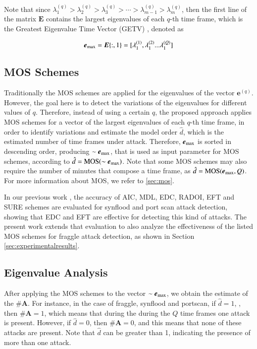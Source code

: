 \documentclass[review]{elsarticle}
\begin{document}
Note that since $\lambda_1^{(q)} > \lambda_2^{(q)} > \lambda_3^{(q)} > \cdots > \lambda_{m-1}^{(q)} > \lambda_m^{(q)}$, then the first line of the matrix $\boldsymbol{E}$ contains the largest eigenvalues of each $q$-th time frame, which is the Greatest Eigenvalue Time
Vector (GETV) \cite{tenorio2013greatest}, denoted as 

\begin{equation}\label{eq:eq08}
\boldsymbol{e}_{\rm max} = \boldsymbol{E}\{:,1\} = [ \lambda_1^{(1)}, \lambda_1^{(2)} ... \lambda_1^{(Q)}]
\end{equation}

\subsection{MOS Schemes}
\label{sec:prop_MOSSchemes}

Traditionally the MOS schemes are applied for the eigenvalues of the vector $\boldsymbol{e}^{(q)}$. However, the goal here is to detect the variations of the eigenvalues for different values of $q$. Therefore, instead of using a certain $q$, the proposed approach applies MOS schemes for a vector of the largest eigenvalues of each $q$-th time frame, in order to identify variations and estimate the model order $\hat{d}$, which is the estimated number of time frames under attack. Therefore, $\boldsymbol{e}_{\rm max}$ is sorted in descending order, producing $\sim\boldsymbol{e}_{\rm max}$, that is used as input parameter for MOS schemes, according to $\hat{d} = \rm{MOS}(\sim\boldsymbol{e}_{\rm max})$. Note that some MOS schemes may also require the number of minutes that compose a time frame, as $\hat{d} = \rm{MOS}(\boldsymbol{e}_{\rm max},\emph{Q})$. For more information about MOS, we refer to \ref{sec:mos}.

In our previous work \cite{tenorio2013greatest}, the accuracy of AIC, MDL, EDC, RADOI, EFT and SURE schemes are evaluated for synflood and port scan attack detection, showing that EDC and EFT are effective for detecting this kind of attacks. The present work extends that evaluation to also analyze the effectiveness of the listed MOS schemes for fraggle attack detection, as shown in Section \ref{sec:experimentalresults}.

\subsection{Eigenvalue Analysis}
\label{sec:prop_EigenvalueAnalysis}

After applying the MOS schemes to the vector $\sim\boldsymbol{e}_{\rm max}$, we obtain the estimate of the $\#\boldsymbol{A}$. For instance, in the case of fraggle, synflood and portscan, if $\hat{d} = 1$, , then $\#\boldsymbol{A} = 1$, which means that during the during the $Q$ time frames one attack is present. However, if $\hat{d} = 0$, then $\#\boldsymbol{A} = 0$, and this means that none of these attacks are present. Note that $\hat{d}$ can be greater than 1, indicating the presence of more than one attack.
\end{document}
